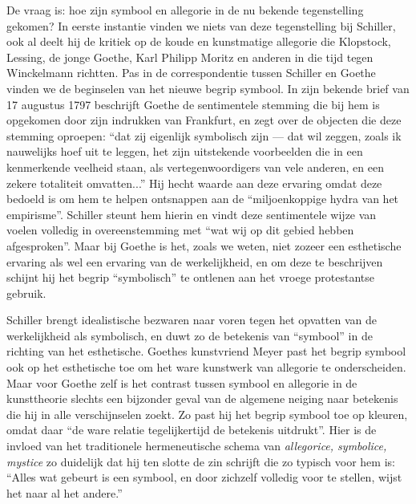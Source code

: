 De vraag is: hoe zijn symbool en allegorie in de nu bekende tegenstelling gekomen? In eerste instantie vinden we niets van deze tegenstelling bij Schiller, ook al deelt hij de kritiek op de koude en kunstmatige allegorie die Klopstock, Lessing, de jonge Goethe, Karl Philipp Moritz en anderen in die tijd tegen Winckelmann richtten. Pas in de correspondentie tussen Schiller en Goethe vinden we de beginselen van het nieuwe begrip symbool. In zijn bekende brief van 17 augustus 1797 beschrijft Goethe de sentimentele stemming die bij hem is opgekomen door zijn indrukken van Frankfurt, en zegt over de objecten die deze stemming oproepen: ``dat zij eigenlijk symbolisch zijn — dat wil zeggen, zoals ik nauwelijks hoef uit te leggen, het zijn uitstekende voorbeelden die in een kenmerkende veelheid staan, als vertegenwoordigers van vele anderen, en een zekere totaliteit omvatten...'' Hij hecht waarde aan deze ervaring omdat deze bedoeld is om hem te helpen ontsnappen aan de ``miljoenkoppige hydra van het empirisme''. Schiller steunt hem hierin en vindt deze sentimentele wijze van voelen volledig in overeenstemming met ``wat wij op dit gebied hebben afgesproken''. Maar bij Goethe is het, zoals we weten, niet zozeer een esthetische ervaring als wel een ervaring van de werkelijkheid, en om deze te beschrijven schijnt hij het begrip ``symbolisch'' te ontlenen aan het vroege protestantse gebruik.

Schiller brengt idealistische bezwaren naar voren tegen het opvatten van de werkelijkheid als symbolisch, en duwt zo de betekenis van ``symbool'' in de richting van het esthetische. Goethes kunstvriend Meyer past het begrip symbool ook op het esthetische toe om het ware kunstwerk van allegorie te onderscheiden. Maar voor Goethe zelf is het contrast tussen symbool en allegorie in de kunsttheorie slechts een bijzonder geval van de algemene neiging naar betekenis die hij in alle verschijnselen zoekt. Zo past hij het begrip symbool toe op kleuren, omdat daar ``de ware relatie tegelijkertijd de betekenis uitdrukt''. Hier is de invloed van het traditionele hermeneutische schema van \textit{allegorice, symbolice, mystice} zo duidelijk dat hij ten slotte de zin schrijft die zo typisch voor hem is: ``Alles wat gebeurt is een symbool, en door zichzelf volledig voor te stellen, wijst het naar al het andere.''

